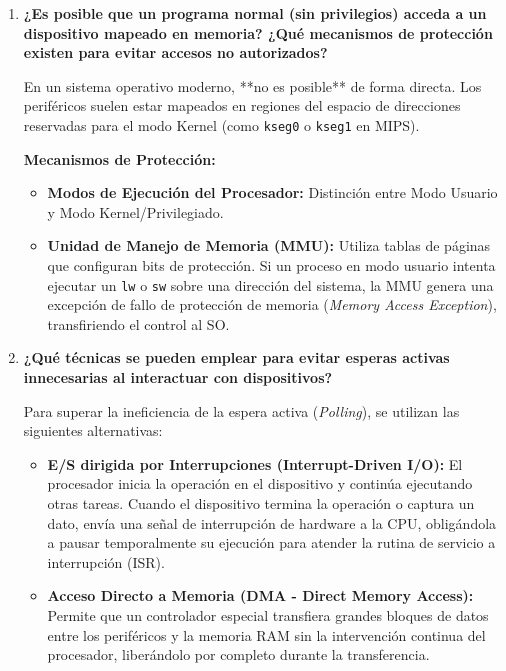 \documentclass[12pt,letterpaper]{article}
\begin{document}
\begin{enumerate}
    \item \textbf{\large\color{UCBlue}¿Es posible que un programa normal (sin privilegios) acceda a un dispositivo mapeado en memoria? ¿Qué mecanismos de protección existen para evitar accesos no autorizados?}
    
    \vspace{0.2cm}
    En un sistema operativo moderno, **no es posible** de forma directa. Los periféricos suelen estar mapeados en regiones del espacio de direcciones reservadas para el modo Kernel (como \texttt{kseg0} o \texttt{kseg1} en MIPS).
    
    \textbf{Mecanismos de Protección:}
    \begin{itemize}
        \item \textbf{Modos de Ejecución del Procesador:} Distinción entre Modo Usuario y Modo Kernel/Privilegiado.
        \item \textbf{Unidad de Manejo de Memoria (MMU):} Utiliza tablas de páginas que configuran bits de protección. Si un proceso en modo usuario intenta ejecutar un \texttt{lw} o \texttt{sw} sobre una dirección del sistema, la MMU genera una excepción de fallo de protección de memoria (\textit{Memory Access Exception}), transfiriendo el control al SO.
    \end{itemize}

    \item \textbf{\large\color{UCBlue}¿Qué técnicas se pueden emplear para evitar esperas activas innecesarias al interactuar con dispositivos?}
    
    \vspace{0.2cm}
    Para superar la ineficiencia de la espera activa (\textit{Polling}), se utilizan las siguientes alternativas:
    \begin{itemize}
        \item \textbf{E/S dirigida por Interrupciones (Interrupt-Driven I/O):} El procesador inicia la operación en el dispositivo y continúa ejecutando otras tareas. Cuando el dispositivo termina la operación o captura un dato, envía una señal de interrupción de hardware a la CPU, obligándola a pausar temporalmente su ejecución para atender la rutina de servicio a interrupción (ISR).
        \item \textbf{Acceso Directo a Memoria (DMA - Direct Memory Access):} Permite que un controlador especial transfiera grandes bloques de datos entre los periféricos y la memoria RAM sin la intervención continua del procesador, liberándolo por completo durante la transferencia.
    \end{itemize}


\end{enumerate}
\end{document}
